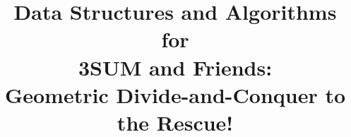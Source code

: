 \title{%
	Data Structures and Algorithms\\
	for\\
	3SUM and Friends:\\
	Geometric Divide-and-Conquer to the Rescue!
}
